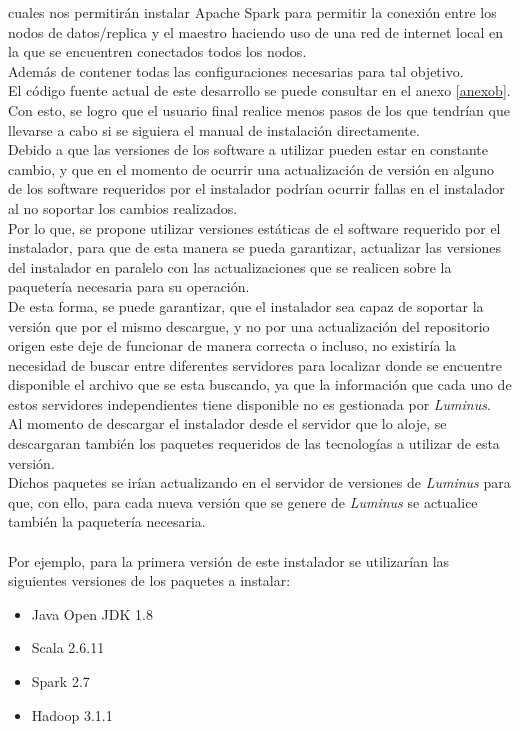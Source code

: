 cuales nos permitirán instalar Apache Spark para permitir la conexión entre los nodos de datos/replica y el maestro haciendo uso de una red de internet local en la que se encuentren conectados todos los nodos.
\\
Además de contener todas las configuraciones necesarias para tal objetivo.  
\\
El código fuente actual de este desarrollo se puede consultar en el anexo \ref{anexob}.
\\
Con esto, se logro que el usuario final realice menos pasos de los que tendrían que llevarse a cabo si se siguiera el manual de instalación directamente. 
\\
Debido a que las versiones de los software a utilizar pueden estar en constante cambio, y que en el momento de ocurrir una actualización de versión en alguno de los software requeridos por el instalador podrían ocurrir fallas en el instalador al no soportar los cambios realizados.
\\
Por lo que, se propone utilizar versiones estáticas de el software requerido por el instalador, para que de esta manera se pueda garantizar, actualizar las versiones del instalador en paralelo con las actualizaciones que se realicen sobre la paquetería necesaria para su operación.
\\
De esta forma, se puede garantizar, que el instalador sea capaz de soportar la versión que por el mismo descargue, y no por una actualización del repositorio origen este deje de funcionar de manera correcta o incluso, no existiría la necesidad de buscar entre diferentes servidores para localizar donde se encuentre disponible el archivo que se esta buscando, ya que la información que cada uno de estos servidores independientes tiene disponible no es gestionada por \emph{Luminus}.
\\
Al momento de descargar el instalador desde el servidor que lo aloje, se descargaran también los paquetes requeridos de las tecnologías a utilizar de esta versión.
\\
Dichos paquetes se irían actualizando en el servidor de versiones de \emph{Luminus} para que, con ello, para cada nueva versión que se genere de \emph{Luminus} se actualice también la paquetería necesaria.
\\
\\
Por ejemplo, para la primera versión de este instalador se utilizarían las siguientes versiones de los paquetes a instalar:
\begin{itemize}
	\item Java Open JDK 1.8
	\item Scala 2.6.11
	\item Spark 2.7
	\item Hadoop 3.1.1
	
\end{itemize}
